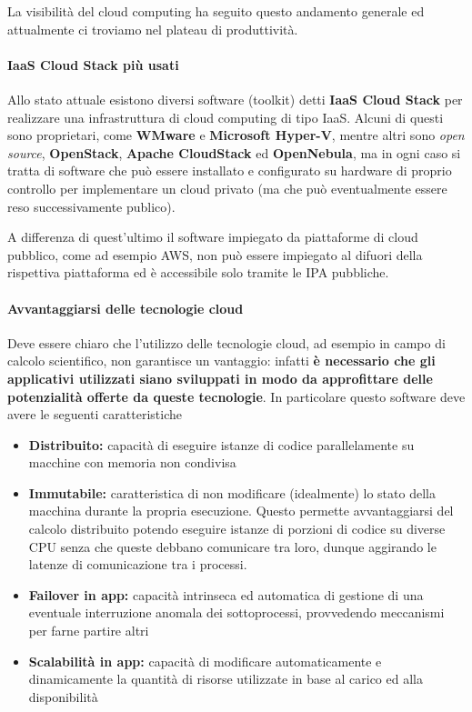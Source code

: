 \documentclass[italian,]{article}
\providecommand{\tightlist}{%
  \setlength{\itemsep}{0pt}\setlength{\parskip}{0pt}}
\let\oldparagraph\paragraph
\renewcommand{\paragraph}[1]{\oldparagraph{#1}\mbox{}}
\begin{document}
La visibilità del cloud computing ha seguito questo andamento generale
ed attualmente ci troviamo nel plateau di produttività.

\paragraph{IaaS Cloud Stack più
usati}\label{iaas-cloud-stack-piuxf9-usati}

Allo stato attuale esistono diversi software (toolkit) detti
\textbf{IaaS Cloud Stack} per realizzare una infrastruttura di cloud
computing di tipo IaaS. Alcuni di questi sono proprietari, come
\textbf{WMware} e \textbf{Microsoft Hyper-V}, mentre altri sono
\emph{open source}, \textbf{OpenStack}, \textbf{Apache CloudStack} ed
\textbf{OpenNebula}, ma in ogni caso si tratta di software che può
essere installato e configurato su hardware di proprio controllo per
implementare un cloud privato (ma che può eventualmente essere reso
successivamente publico).

A differenza di quest'ultimo il software impiegato da piattaforme di
cloud pubblico, come ad esempio AWS, non può essere impiegato al difuori
della rispettiva piattaforma ed è accessibile solo tramite le IPA
pubbliche.

\paragraph{Avvantaggiarsi delle tecnologie
cloud}\label{avvantaggiarsi-delle-tecnologie-cloud}

Deve essere chiaro che l'utilizzo delle tecnologie cloud, ad esempio in
campo di calcolo scientifico, non garantisce un vantaggio: infatti
\textbf{è necessario che gli applicativi utilizzati siano sviluppati in
modo da approfittare delle potenzialità offerte da queste tecnologie}.
In particolare questo software deve avere le seguenti caratteristiche

\begin{itemize}
\tightlist
\item
  \textbf{Distribuito:} capacità di eseguire istanze di codice
  parallelamente su macchine con memoria non condivisa
\item
  \textbf{Immutabile:} caratteristica di non modificare (idealmente) lo
  stato della macchina durante la propria esecuzione. Questo permette
  avvantaggiarsi del calcolo distribuito potendo eseguire istanze di
  porzioni di codice su diverse CPU senza che queste debbano comunicare
  tra loro, dunque aggirando le latenze di comunicazione tra i processi.
\item
  \textbf{Failover in app:} capacità intrinseca ed automatica di
  gestione di una eventuale interruzione anomala dei sottoprocessi,
  provvedendo meccanismi per farne partire altri
\item
  \textbf{Scalabilità in app:} capacità di modificare automaticamente e
  dinamicamente la quantità di risorse utilizzate in base al carico ed
  alla disponibilità
\end{itemize}
\end{document}
